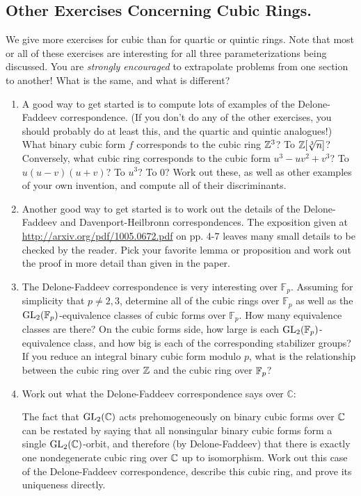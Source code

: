 \documentclass[12pt,amsfont]{amsart}
\begin{document}
\subsection{{\bf Other Exercises Concerning Cubic Rings.}}
  We give more exercises for cubic than for quartic or quintic rings. Note that most or all of these exercises are interesting for all three parameterizations
  being discussed. You are {\itshape strongly encouraged} to extrapolate problems from one section to another! What is the same, and what is
  different?
\begin{enumerate}

\item A good way to get started is to compute lots of examples of the Delone-Faddeev correspondence.
(If you don't do any of the other exercises, you should probably do at least this, and the quartic and quintic analogues!)
What binary cubic form $f$ corresponds
           to the cubic ring ${\mathbb Z}^3$?  To ${\mathbb Z}[\sqrt[3]{n}]$?
           Conversely, what cubic ring corresponds to the cubic form $u^3 - uv^2 + v^3$? To $u (u - v) (u + v)$?
           To $u^3$? To $0$? Work out these, as well as other examples of your own invention, and compute all of their
           discriminants.
\item Another good way to get started is to work out the details of the Delone-Faddeev and Davenport-Heilbronn
correspondences. The exposition given at \url{http://arxiv.org/pdf/1005.0672.pdf} on pp. 4-7 leaves many small details
to be checked by the reader. Pick your favorite lemma or proposition and work out the proof in more detail than given in the paper.
\item The Delone-Faddeev correspondence is very interesting over $\mathbb{F}_p$. Assuming for simplicity
that $p \neq 2, 3$, determine all of the cubic rings over $\mathbb{F}_p$ as well as the $\operatorname{GL}_2({\mathbb F}_p)$-equivalence
classes of cubic forms over $\mathbb{F}_p$. How many equivalence classes are there? On the cubic forms side, how large
is each $\operatorname{GL}_2({\mathbb F}_p)$-equivalence class, and how big is each of the corresponding stabilizer groups? If you reduce an integral binary
cubic form modulo $p$, what is the relationship between the cubic ring over ${\mathbb Z}$ and the cubic ring over ${\mathbb F}_p$?
\item Work out what the Delone-Faddeev correspondence says over $\mathbb{C}$:

The fact that $\operatorname{GL}_2({\mathbb C})$ acts prehomogeneously on binary cubic forms over ${\mathbb C}$ can be restated by saying that 
all nonsingular
binary cubic forms form a single $\operatorname{GL}_2({\mathbb C})$-orbit, and therefore (by Delone-Faddeev) that there is exactly one nondegenerate 
cubic ring over ${\mathbb C}$
up to isomorphism. Work out this case of the Delone-Faddeev correspondence, describe this cubic ring, and prove its uniqueness directly.


\end{enumerate}
\end{document}
